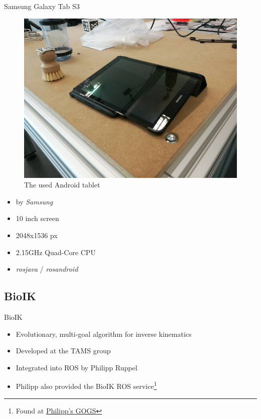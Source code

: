 \documentclass[t]{beamer}
\begin{document}
\begin{frame}{Samsung Galaxy Tab S3}
\begin{minipage}{0.45\linewidth}
	\begin{figure}
		\includegraphics[width=\linewidth]{assets/chpt_concepts/tablet.png}
		\caption{The used Android tablet}
	\end{figure}
\end{minipage}
\begin{minipage}{0.5\linewidth}
	\begin{itemize}
		\item by \textit{Samsung} \cite{samsung:galaxytabs3}
		\item 10 inch screen
		\item 2048x1536 px
		\item 2.15GHz Quad-Core CPU
		\item \textit{rosjava} / \textit{rosandroid}
	\end{itemize}
\end{minipage}
\end{frame}

\subsection{BioIK}

\begin{frame}{BioIK}
\begin{itemize}
	\item Evolutionary, multi-goal algorithm for inverse kinematics
	\item Developed at the TAMS group \cite{Starke2017,Starkea2017}
	\item Integrated into ROS by Philipp Ruppel \cite{Ruppel17}
	\item Philipp also provided the BioIK ROS service\footnote{Found at \href{https://gogs.crossmodal-learning.org/philipp.ruppel/bio_ik_service}{Philipp's GOGS}}
\end{itemize}
\end{frame}
\end{document}
